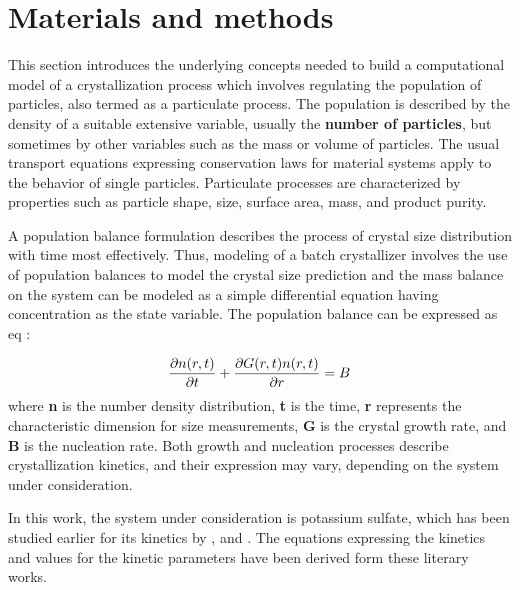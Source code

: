\documentclass[3p,times,authoryear]{elsarticle}
\begin{document}
\section{Materials and methods} \label{model}


This section introduces the underlying concepts needed to build a computational model of a crystallization process which involves regulating the population of particles, also termed as a particulate process. 
The population is described by the density of a suitable extensive variable, usually the \textbf{number of particles}, but sometimes by other variables such as the mass or volume of particles. The usual transport equations expressing conservation laws for material systems apply to the behavior of single particles. Particulate processes are characterized by properties such as particle shape, size, surface area, mass, and product purity. \par
A population balance formulation describes the process of crystal size distribution with time most effectively. Thus, modeling of a batch crystallizer involves the use of population balances to model the crystal size prediction and the mass balance on the system can be modeled as a simple differential equation having concentration as the state variable.
The population balance can be expressed as eq :

\begin{equation} \label{populationbalance}
	\frac{\partial{n(r,t)}}{\partial{t}} + \frac{\partial{G(r,t)n(r,t)}}{\partial{r}} = B  \nolinebreak
\end{equation}
where \textbf{n} is the number density distribution, \textbf{t} is the time, \textbf{r} represents the characteristic dimension for size measurements, \textbf{G} is the crystal growth rate, and \textbf{B} is the nucleation rate. Both growth and nucleation processes describe crystallization kinetics, and their expression may vary, depending on the system under consideration.

In this work, the system under consideration is potassium sulfate, which has been studied earlier for its kinetics by \cite{hu}, \cite{shi} and \cite{paeng}. The equations expressing the kinetics and values for the kinetic parameters have been derived form these literary works. 
\end{document}
